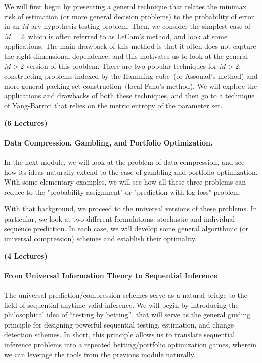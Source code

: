 \documentclass[12pt]{article}
\begin{document}
We will first begin by presenting a general technique that relates the minimax risk of estimation (or more general decision problems) to the probability of error in an $M$-ary hypothesis testing problem. Then, we consider the simplest case of $M=2$, which is often referred to as LeCam's method, and look at some applications. The main drawback of this method is that it often does not capture the right dimensional dependence, and this motivates us to look at the general $M>2$ version of this problem. There are two popular techniques for $M>2$: constructing problems indexed by the Hamming cube~(or Assouad's method) and more general packing set construction~(local Fano's method). We will explore the applications and drawbacks of both these techniques, and then go to a technique of Yang-Barron that relies on the metric entropy of the parameter set. 

\hfill \textbf{(6 Lectures)}

\paragraph{Data Compression, Gambling, and Portfolio Optimization.} In the next module, we will look at the problem of data compression, and see how its ideas naturally extend to the case of gambling and portfolio optimization. With some elementary examples, we will see how all these three problems can reduce to the "probability assignment" or "prediction with log loss" problem. 

With that background, we proceed to the universal versions of these problems. In particular, we look at two different formulations: stochastic and individual sequence prediction. In each case, we will develop some general algorithmic (or universal compression) schemes and establish their optimality. 

\hfill \textbf{(4 Lectures)}

\paragraph{From Universal Information Theory to Sequential Inference}
The universal prediction/compression schemes serve as a natural bridge to the field of sequential anytime-valid inference. We will begin by introducing the philosophical idea of ``testing by betting'', that will serve as the general guiding principle for designing powerful sequential testing, estimation, and change detection schemes. In short, this principle allows us to translate sequential inference problems into a repeated betting/portfolio optimization games, wherein we can leverage the tools from the previous module naturally.  
\end{document}
